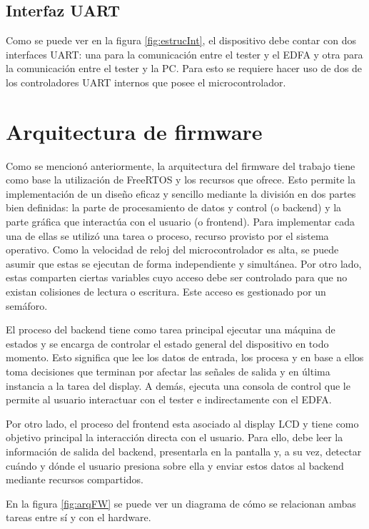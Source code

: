 \subsection{Interfaz UART}

Como se puede ver en la figura \ref{fig:estrucInt}, el dispositivo debe contar con dos interfaces UART: una para la comunicación entre el tester y el EDFA y otra para la comunicación entre el tester y la PC. Para esto se requiere hacer uso de dos de los controladores UART internos que posee el microcontrolador.

\section{Arquitectura de firmware}

Como se mencionó anteriormente, la arquitectura del firmware del trabajo tiene como base la utilización de FreeRTOS y los recursos que ofrece. Esto permite la implementación de un diseño eficaz y sencillo mediante la división en dos partes bien definidas: la parte de procesamiento de datos y control (o backend) y la parte gráfica que interactúa con el usuario (o frontend). Para implementar cada una de ellas se utilizó una tarea o proceso, recurso provisto por el sistema operativo. Como la velocidad de reloj del microcontrolador es alta, se puede asumir que estas se ejecutan de forma independiente y simultánea. Por otro lado, estas comparten ciertas variables cuyo acceso debe ser controlado para que no existan colisiones de lectura o escritura. Este acceso es gestionado por un semáforo.

El proceso del backend tiene como tarea principal ejecutar una máquina de estados y se encarga de controlar el estado general del dispositivo en todo momento. Esto significa que lee los datos de entrada, los procesa y en base a ellos toma decisiones que terminan por afectar las señales de salida y en última instancia a la tarea del display. A demás, ejecuta una consola de control que le permite al usuario interactuar con el tester e indirectamente con el EDFA. 

Por otro lado, el proceso del frontend esta asociado al display LCD y tiene como objetivo principal la interacción directa con el usuario. Para ello, debe leer la información de salida del backend, presentarla en la pantalla y, a su vez, detectar cuándo y dónde el usuario presiona sobre ella y enviar estos datos al backend mediante recursos compartidos. 

En la figura \ref{fig:arqFW} se puede ver un diagrama de cómo se relacionan ambas tareas entre sí y con el hardware.

